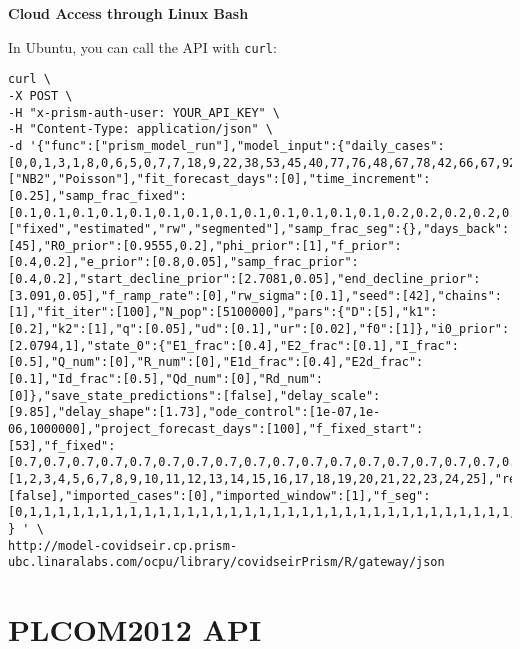 \documentclass[
]{book}
\begin{document}
\textbf{Cloud Access through Linux Bash}

In Ubuntu, you can call the API with \texttt{curl}:

\begin{verbatim}
curl \
-X POST \
-H "x-prism-auth-user: YOUR_API_KEY" \
-H "Content-Type: application/json" \
-d '{"func":["prism_model_run"],"model_input":{"daily_cases":[0,0,1,3,1,8,0,6,5,0,7,7,18,9,22,38,53,45,40,77,76,48,67,78,42,66,67,92,16,70,43,53,55,53,29,26,37,25,45,34,40,35],"obs_model":["NB2","Poisson"],"fit_forecast_days":[0],"time_increment":[0.25],"samp_frac_fixed":[0.1,0.1,0.1,0.1,0.1,0.1,0.1,0.1,0.1,0.1,0.1,0.1,0.1,0.2,0.2,0.2,0.2,0.2,0.2,0.2,0.2,0.2,0.2,0.2,0.2,0.2,0.2,0.2,0.2,0.2,0.2,0.2,0.2,0.2,0.2,0.2,0.2,0.2,0.2,0.2,0.2,0.2],"samp_frac_type":["fixed","estimated","rw","segmented"],"samp_frac_seg":{},"days_back":[45],"R0_prior":[0.9555,0.2],"phi_prior":[1],"f_prior":[0.4,0.2],"e_prior":[0.8,0.05],"samp_frac_prior":[0.4,0.2],"start_decline_prior":[2.7081,0.05],"end_decline_prior":[3.091,0.05],"f_ramp_rate":[0],"rw_sigma":[0.1],"seed":[42],"chains":[1],"fit_iter":[100],"N_pop":[5100000],"pars":{"D":[5],"k1":[0.2],"k2":[1],"q":[0.05],"ud":[0.1],"ur":[0.02],"f0":[1]},"i0_prior":[2.0794,1],"state_0":{"E1_frac":[0.4],"E2_frac":[0.1],"I_frac":[0.5],"Q_num":[0],"R_num":[0],"E1d_frac":[0.4],"E2d_frac":[0.1],"Id_frac":[0.5],"Qd_num":[0],"Rd_num":[0]},"save_state_predictions":[false],"delay_scale":[9.85],"delay_shape":[1.73],"ode_control":[1e-07,1e-06,1000000],"project_forecast_days":[100],"f_fixed_start":[53],"f_fixed":[0.7,0.7,0.7,0.7,0.7,0.7,0.7,0.7,0.7,0.7,0.7,0.7,0.7,0.7,0.7,0.7,0.7,0.7,0.7,0.7,0.7,0.7,0.7,0.7,0.7,0.7,0.7,0.7,0.7,0.7,0.7,0.7,0.7,0.7,0.7,0.7,0.7,0.7,0.7,0.7,0.7,0.7,0.7,0.7,0.7,0.7,0.7,0.7,0.7,0.7,0.7,0.7,0.7,0.7,0.7,0.7,0.7,0.7,0.7,0.7,0.2,0.2,0.2,0.2,0.2,0.2,0.2,0.2,0.2,0.2,0.2,0.2,0.2,0.2,0.2,0.2,0.2,0.2,0.2,0.2,0.2,0.2,0.2,0.2,0.2,0.2,0.2,0.2,0.2,0.2],"forecast_iter":[1,2,3,4,5,6,7,8,9,10,11,12,13,14,15,16,17,18,19,20,21,22,23,24,25],"return_states":[false],"imported_cases":[0],"imported_window":[1],"f_seg":[0,1,1,1,1,1,1,1,1,1,1,1,1,1,1,1,1,1,1,1,1,1,1,1,1,1,1,1,1,1,1,1,1,1,1,1,1,1,1,1,1,1,1,1,1,1,1,1,1,1,1,1,1,1,1,1,1,1,1,1,1,1,1,1,1,1,1,1,1,1,1,1,1,1,1,1,1,1,1,1,1,1,1,1,1,1,1,1,1,1,1,1,1,1,1,1,1,1,1,1,1,1,1,1,1,1,1,1,1,1,1,1,1,1,1,1,1,1,1,1,1,1,1,1,1,1,1,1,1,1,1,1,1,1,1,1,1,1,1,1,1,1]} 
} ' \
http://model-covidseir.cp.prism-ubc.linaralabs.com/ocpu/library/covidseirPrism/R/gateway/json
\end{verbatim}

\hypertarget{plcom2012-api}{%
\section{PLCOM2012 API}\label{plcom2012-api}}
\end{document}
